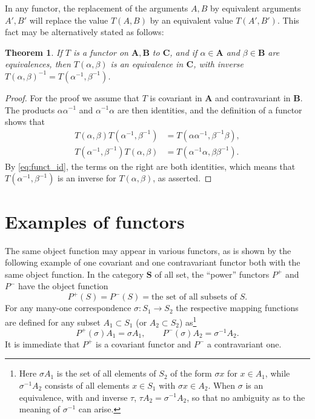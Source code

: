\documentclass[11pt,a4paper]{report}
\newtheorem{theorem}{Theorem}
\begin{document}
In any functor, the replacement of the arguments $A,B$ by equivalent arguments $A',B'$ will replace the 
value $T(A,B)$ by  an equivalent value $T(A',B')$. This fact may be alternatively stated as follows:
\begin{theorem}\label{thm:nat_eq}
	If $T$ is a functor on $\mathbf{A},\mathbf{B}$ to $\mathbf{C}$, and if $\alpha\in\mathbf{A}$
	and $\beta\in\mathbf{B}$ are equivalences, then $T(\alpha,\beta)$ is an equivalence in $\mathbf{C}$,
	with inverse $T{(\alpha,\beta)}^{-1}=T(\alpha^{-1},\beta^{-1})$.
\end{theorem}
\begin{proof}
	For the proof we assume that $T$ is covariant in $\mathbf{A}$ and contravariant in $\mathbf{B}$.
	The products $\alpha\alpha^{-1}$ and $\alpha^{-1}\alpha$ are then identities, and the definition
	of a functor shows that
	\begin{align*}
		T(\alpha,\beta)T(\alpha^{-1},\beta^{-1})&=T(\alpha\alpha^{-1},\beta^{-1}\beta),\\
		T(\alpha^{-1},\beta^{-1})T(\alpha,\beta)&=T(\alpha^{-1}\alpha,\beta\beta^{-1}).
	\end{align*}
	By \cref{eq:funct_id}, the terms on the right are both identities, which means
	that $T(\alpha^{-1},\beta^{-1})$ is an inverse for $T(\alpha,\beta)$, as asserted.
\end{proof}

\section{Examples of functors}\label{sec:funct_examples}
The same object function may appear in various functors, as is shown by the following example of one
covariant and one contravariant functor both with the same object function. In the category $\mathbf{S}$
of all set, the ``power'' functors $P^+$ and $P^-$ have the object function
\begin{equation*}
	P^+(S)=P^-(S)=\text{the set of all subsets of $S$.}
\end{equation*}
For any many\hyp{}one correspondence $\sigma:S_1\rightarrow S_2$ the respective mapping functions are defined
for any subset $A_1\subset S_1$ (or $A_2\subset S_2$) as\footnote{Here $\sigma A_1$ is the set of all
elements of $S_2$ of the form $\sigma x$ for $x\in A_1$, while $\sigma^{-1}A_2$ consists of all elements
$x\in S_1$ with $\sigma x\in A_2$. When $\sigma$ is an equivalence, with and inverse $\tau$,
$\tau A_2=\sigma^{-1}A_2$, so that no ambiguity as to the meaning of $\sigma^{-1}$ can arise.}
\begin{equation*}
	P^+(\sigma)A_1=\sigma A_1, \qquad P^-(\sigma)A_2=\sigma^{-1}A_2.
\end{equation*}
It is immediate that $P^+$ is a covariant functor and $P^-$ a contravariant one.
\end{document}
